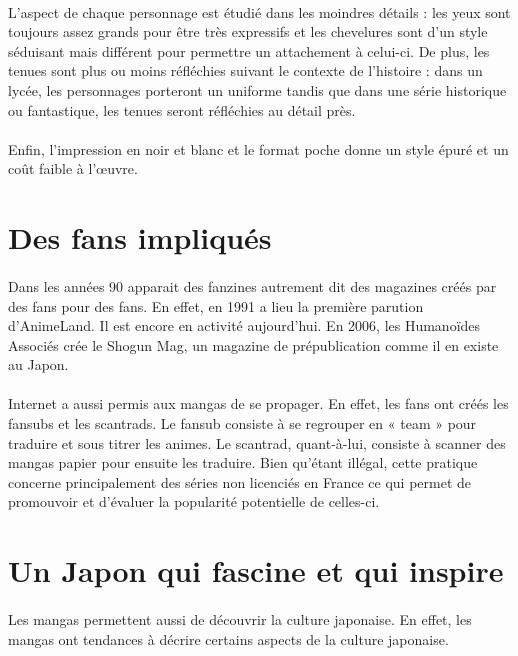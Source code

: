 \paragraph{}
L’aspect de chaque personnage est étudié dans les moindres détails : les yeux sont toujours assez grands pour être très expressifs et les chevelures sont d’un style séduisant mais différent pour permettre un attachement à celui-ci. De plus, les tenues sont plus ou moins réfléchies suivant le contexte de l’histoire : dans un lycée, les personnages porteront un uniforme tandis que dans une série historique ou fantastique, les tenues seront réfléchies au détail près. 
\paragraph{}
Enfin, l’impression en noir et blanc et le format poche donne un style épuré et un coût faible à l’œuvre. 

\section{Des fans impliqués}
\paragraph{}
Dans les années 90 apparait des fanzines autrement dit des magazines créés par des fans pour des fans. En effet, en 1991 a lieu la première parution d’AnimeLand. Il est encore en activité aujourd’hui. En 2006, les Humanoïdes Associés crée le Shogun Mag, un magazine de prépublication comme il en existe au Japon. 
\paragraph{}
Internet a aussi permis aux mangas de se propager. En effet, les fans ont créés les fansubs et les scantrads. Le fansub consiste à se regrouper en « team » pour traduire et sous titrer les animes. Le scantrad, quant-à-lui, consiste à scanner des mangas papier pour ensuite les traduire. Bien qu’étant illégal, cette pratique concerne principalement des séries non licenciés en France ce qui permet de promouvoir et d’évaluer la popularité potentielle de celles-ci.

\section{Un Japon qui fascine et qui inspire}
\paragraph{}
Les mangas permettent aussi de découvrir la culture japonaise. En effet, les mangas ont tendances à décrire certains aspects de la culture japonaise. 
